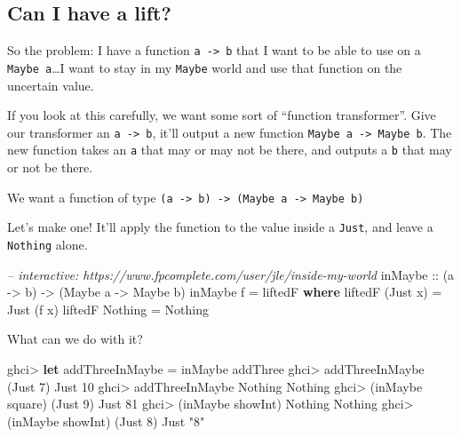 \documentclass[]{article}
\newenvironment{Shaded}{}{}
\newcommand{\KeywordTok}[1]{\textcolor[rgb]{0.00,0.44,0.13}{\textbf{{#1}}}}
\newcommand{\DataTypeTok}[1]{\textcolor[rgb]{0.56,0.13,0.00}{{#1}}}
\newcommand{\DecValTok}[1]{\textcolor[rgb]{0.25,0.63,0.44}{{#1}}}
\newcommand{\StringTok}[1]{\textcolor[rgb]{0.25,0.44,0.63}{{#1}}}
\newcommand{\CommentTok}[1]{\textcolor[rgb]{0.38,0.63,0.69}{\textit{{#1}}}}
\newcommand{\OtherTok}[1]{\textcolor[rgb]{0.00,0.44,0.13}{{#1}}}
\newcommand{\FunctionTok}[1]{\textcolor[rgb]{0.02,0.16,0.49}{{#1}}}
\newcommand{\NormalTok}[1]{{#1}}
\begin{document}
\subsection{Can I have a lift?}\label{can-i-have-a-lift}

So the problem: I have a function \texttt{a\ -\textgreater{}\ b} that I
want to be able to use on a \texttt{Maybe\ a}\ldots{}I want to stay in
my \texttt{Maybe} world and use that function on the uncertain value.

If you look at this carefully, we want some sort of ``function
transformer''. Give our transformer an \texttt{a\ -\textgreater{}\ b},
it'll output a new function
\texttt{Maybe\ a\ -\textgreater{}\ Maybe\ b}. The new function takes an
\texttt{a} that may or may not be there, and outputs a \texttt{b} that
may or not be there.

We want a function of type
\texttt{(a\ -\textgreater{}\ b)\ -\textgreater{}\ (Maybe\ a\ -\textgreater{}\ Maybe\ b)}

Let's make one! It'll apply the function to the value inside a
\texttt{Just}, and leave a \texttt{Nothing} alone.

\begin{Shaded}
\begin{Highlighting}[]
\CommentTok{-- interactive: https://www.fpcomplete.com/user/jle/inside-my-world}
\OtherTok{inMaybe ::} \NormalTok{(a }\OtherTok{->} \NormalTok{b) }\OtherTok{->} \NormalTok{(}\DataTypeTok{Maybe} \NormalTok{a }\OtherTok{->} \DataTypeTok{Maybe} \NormalTok{b)}
\NormalTok{inMaybe f }\FunctionTok{=} \NormalTok{liftedF}
  \KeywordTok{where}
    \NormalTok{liftedF (}\DataTypeTok{Just} \NormalTok{x) }\FunctionTok{=} \DataTypeTok{Just} \NormalTok{(f x)}
    \NormalTok{liftedF }\DataTypeTok{Nothing}  \FunctionTok{=} \DataTypeTok{Nothing}
\end{Highlighting}
\end{Shaded}

What can we do with it?

\begin{Shaded}
\begin{Highlighting}[]
\NormalTok{ghci}\FunctionTok{>} \KeywordTok{let} \NormalTok{addThreeInMaybe }\FunctionTok{=} \NormalTok{inMaybe addThree}
\NormalTok{ghci}\FunctionTok{>} \NormalTok{addThreeInMaybe (}\DataTypeTok{Just} \DecValTok{7}\NormalTok{)}
\DataTypeTok{Just} \DecValTok{10}
\NormalTok{ghci}\FunctionTok{>} \NormalTok{addThreeInMaybe }\DataTypeTok{Nothing}
\DataTypeTok{Nothing}
\NormalTok{ghci}\FunctionTok{>} \NormalTok{(inMaybe square) (}\DataTypeTok{Just} \DecValTok{9}\NormalTok{)}
\DataTypeTok{Just} \DecValTok{81}
\NormalTok{ghci}\FunctionTok{>} \NormalTok{(inMaybe showInt) }\DataTypeTok{Nothing}
\DataTypeTok{Nothing}
\NormalTok{ghci}\FunctionTok{>} \NormalTok{(inMaybe showInt) (}\DataTypeTok{Just} \DecValTok{8}\NormalTok{)}
\DataTypeTok{Just} \StringTok{"8"}
\end{Highlighting}
\end{Shaded}
\end{document}
